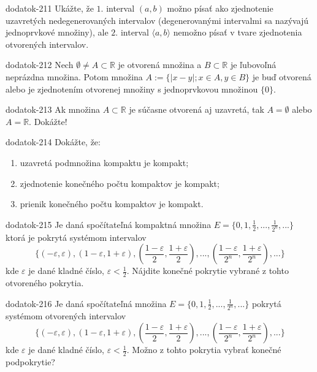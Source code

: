 \begin{defproblem}{dodatok-211}
Ukážte, že $1.$ interval $(a,b)$ možno písať ako zjednotenie uzavretých nedegenerovaných intervalov (degenerovanými intervalmi sa nazývajú jednoprvkové množiny), ale $2.$ interval $\langle a,b \rangle$ nemožno písať v tvare zjednotenia otvorených intervalov.
\end{defproblem}

\begin{defproblem}{dodatok-212}
Nech $\emptyset \neq A \subset \mathbb{R}$ je otvorená množina a $B \subset \mathbb{R}$ je ľubovoľná neprázdna množina. Potom množina $A:=\{|x-y|; x \in A, y \in B\}$ je buď otvorená alebo je zjednotením otvorenej množiny s jednoprvkovou množinou $\{0 \}$.
\end{defproblem}

\begin{defproblem}{dodatok-213}
Ak množina $A \subset \mathbb{R}$ je súčasne otvorená aj uzavretá, tak $A=\emptyset$ alebo $A=\mathbb{R}$. Dokážte!
\end{defproblem}

\begin{defproblem}{dodatok-214}
Dokážte, že:
\begin{enumerate}
\item uzavretá podmnožina kompaktu je kompakt;
\item zjednotenie konečného počtu kompaktov je kompakt;
\item prienik konečného počtu kompaktov je kompakt.
\end{enumerate}
\end{defproblem}

\begin{defproblem}{dodatok-215}
Je daná spočítateľná kompaktná množina
$E=\{0,1,\frac{1}{2},...,\frac{1}{2^n},...\}$
ktorá je pokrytá systémom intervalov
$$
\{
    (-\varepsilon, \varepsilon),
    (1-\varepsilon,1+\varepsilon),
    (\frac{1-\varepsilon}{2},\frac{1+\varepsilon}{2}),
    ...,
    (\frac{1-\varepsilon}{2^n},
    \frac{1+\varepsilon}{2^n}),
    ...
\}
$$
kde $\varepsilon$ je dané kladné číslo, $\varepsilon<\frac{1}{2}$. Nájdite
konečné pokrytie vybrané z tohto otvoreného pokrytia.
\end{defproblem}

\begin{defproblem}{dodatok-216}
Je daná spočítateľná množina
$E=\{0,1,\frac{1}{2},...,\frac{1}{2^n},... \}$
pokrytá systémom otvorených intervalov
$$
\{
    (-\varepsilon, \varepsilon),
    (1-\varepsilon,1+\varepsilon),
    (\frac{1-\varepsilon}{2},\frac{1+\varepsilon}{2}),
    ...,
    (\frac{1-\varepsilon}{2^n},\frac{1+\varepsilon}{2^n}),
    ...
\}
$$
kde $\varepsilon$ je dané kladné číslo, $\varepsilon<\frac{1}{2}$. Možno z tohto
pokrytia vybrať konečné podpokrytie?
\end{defproblem}


